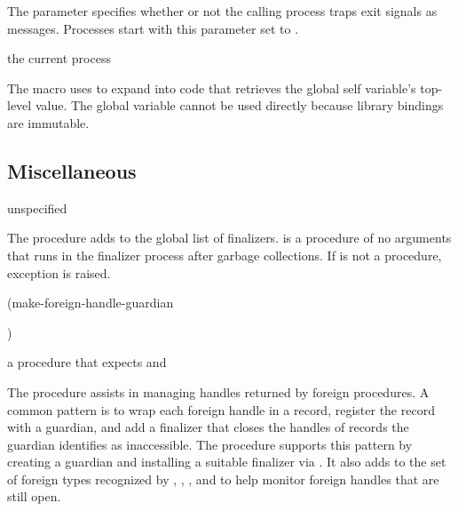 The  parameter specifies whether or not the
calling process traps exit signals as messages. Processes start with
this parameter set to .

\begin{syntax}
\end{syntax}
\returns{} the current process

The  macro uses  to expand into
code that retrieves the global self variable's top-level value. The
global variable cannot be used directly because library bindings are
immutable.

\subsection{Miscellaneous}

\begin{procedure}
\end{procedure}
\returns{} unspecified

The  procedure adds
 to the global list of finalizers.  is a
procedure of no arguments that runs in the finalizer process after
garbage collections. If  is not a procedure, exception
 is raised.

\begin{procedure}
\codebegin
(make-foreign-handle-guardian   \strut
                                )\strut
\codeend
\end{procedure}
\returns{} a procedure that expects  and 

The  procedure assists in managing handles
returned by foreign procedures.
A common pattern is to wrap each foreign handle in a record, register the
record with a guardian, and add a finalizer that closes the handles of records
the guardian identifies as inaccessible.
The  procedure supports this pattern
by creating a guardian and installing a suitable finalizer via .
It also adds  to the set of foreign types recognized by
,
,
, and
to help monitor foreign handles that are still open.

